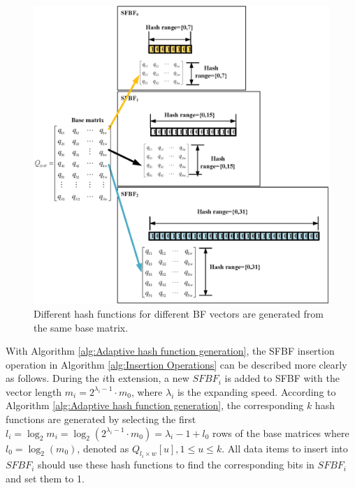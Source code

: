 \documentclass[10pt,journal,compsoc]{IEEEtran}
\begin{document}
\begin{figure}[!h]
\centering
\includegraphics[width=3.2 in]{fig/Hash_function_generated_from_base_matrix}
\caption{Different hash functions for different BF vectors are generated from the same base matrix.}
\label{fig:Hash function generated from base matrix}
\end{figure}

With Algorithm \ref{alg:Adaptive hash function generation}, the SFBF insertion operation in Algorithm \ref{alg:Insertion Operations}
 can be described more clearly as follows.
During the $i$th extension, a new $SFBF_i$ is added to SFBF with the vector length ${m_i} = {2^{\lambda_i  - 1}} \cdot {m_0}$, where $\lambda_i$ is the  expanding speed. According to Algorithm \ref{alg:Adaptive hash function generation},
the corresponding $k$ hash functions are generated by selecting the first ${l_i} =\log_2m_i= {\log _2}\left( {2^{\lambda_i  - 1}} \cdot {m_0} \right) = \lambda_i  - 1 + {l_0}$ rows of the base matrices where ${l_0} = {\log _2}\left( {{m_0}} \right)$, denoted as ${Q_{{l_i} \times w}}[u], 1 \le u \le k$. All data items to insert into $SFBF_i$ should use these hash functions to find the corresponding bits in $SFBF_i$ and set them to 1.
\end{document}
